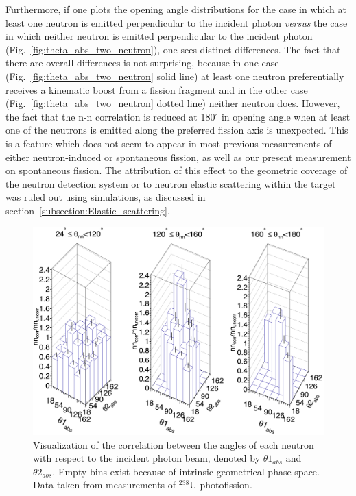 Furthermore, if one plots the opening angle distributions for the case in which at least one neutron is emitted perpendicular to the incident photon \textit{versus} the case in which neither neutron is emitted perpendicular to the incident photon (Fig.~\ref{fig:theta_abs_two_neutron}), one sees distinct differences.
The fact that there are overall differences is not surprising, because in one case (Fig.~\ref{fig:theta_abs_two_neutron} solid line) at least one neutron preferentially receives a kinematic boost from a fission fragment and in the other case (Fig.~\ref{fig:theta_abs_two_neutron} dotted line) neither neutron does.
However, the fact that the n-n correlation is reduced at 180$^{\circ}$ in opening angle when at least one of the neutrons is emitted along the preferred fission axis is unexpected.
This is a feature which does not seem to appear in most previous measurements of either neutron-induced or spontaneous fission, as well as our present measurement on spontaneous fission.
The attribution of this effect to the geometric coverage of the neutron detection system or to neutron elastic scattering within the target was ruled out using simulations, as discussed in section~\ref{subsection:Elastic_scattering}.

\begin{figure}
    \includegraphics[width = \figsize\textwidth]{theta_abs_LEGO.png}
    \caption{Visualization of the correlation between the angles of each neutron with respect to the incident photon beam, denoted by $\theta 1_{abs}$ and $\theta 2_{abs}$.
    Empty bins exist because of intrinsic geometrical phase-space.
    Data taken from measurements of $^{238}$U photofission.}
    \label{fig:theta_abs_LEGO}
\end{figure}

